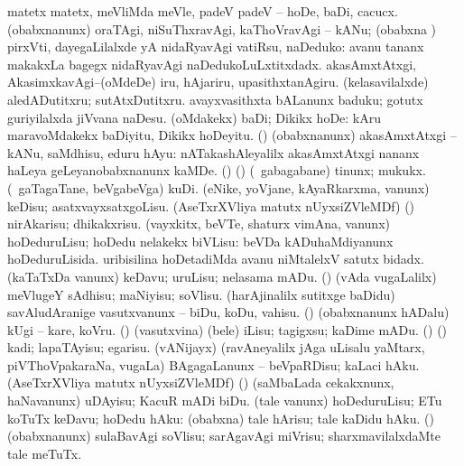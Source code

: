 \noindent
\gl{\pagu}
\bmng
\bnum
{}   
\banum
{} matetx matetx, meVliMda meVle, padeV padeV -- hoDe, baDi, cacucx. 
 (obabxnanunx) oraTAgi, niSuThxravAgi, kaThoVravAgi -- kANu; (obabxna \vi) pirxVti, dayegaLilalxde yA nidaRyavAgi vatiRsu, naDeduko:  avanu tananx makakxLa bagegx nidaRyavAgi naDedukoLuLxtitxdadx. 
 akasAmxtAtxgi, AkasimxkavAgi--(oMdeDe) iru, hAjariru, upasithxtanAgiru. 
 (kelasavilalxde) aledADutitxru; sutAtxDutitxru. 
 avayxvasithxta bALanunx baduku; gotutx guriyilalxda jiVvana naDesu. 
\eanum
\numie
{}  
\banum
{} (oMdakekx) baDi; Dikikx hoDe:  kAru maravoMdakekx baDiyitu, Dikikx hoDeyitu. 
 (\rUpa) (obabxnanunx) akasAmxtAtxgi -- kANu, saMdhisu, eduru hAyu:  nATakashAleyalilx akasAmxtAtxgi nananx haLeya geLeyanobabxnanunx kaMDe. 
\eanum
\numie
{}  (\birx) (\ashi) 
\banum
{} (\kanmu\ gabagabane) tinunx; mukukx. 
 (\kanmu\ gaTagaTane, beVgabeVga) kuDi. 
 (eNike, yoVjane, kAyaRkarxma, \mo vanunx) keDisu; asatxvayxsatxgoLisu. 
 (AseTxrXVliya matutx nUyxsiZVleMDf) (\AmA) nirAkarisu; dhikakxrisu. 
\eanum
\numie
{}  
\banum
{} (vayxkitx, beVTe, shaturx vimAna, \mo vanunx) hoDeduruLisu; hoDedu nelakekx biVLisu:  beVDa kADuhaMdiyanunx hoDeduruLisida.  uribisilina hoDetadiMda avanu niMtalelxV satutx bidadx. 
 (kaTaTxDa \mo vanunx) keDavu; uruLisu; nelasama mADu. 
 (\rUpa) (vAda \mo vugaLalilx) meVlugeY sAdhisu; maNiyisu; soVlisu. 
 (harAjinalilx sutitxge baDidu) savAludAranige vasutxvanunx -- biDu, koDu, vahisu. 
 (\AmA) (obabxnanunx hADalu) kUgi -- kare, koVru. 
 (\AmA) (vasutxvina) (bele) iLisu; tagigxsu; kaDime mADu. 
 (\ame) (\ashi) kadi; lapaTAyisu; egarisu. 
 (vANijayx) (ravAneyalilx jAga uLisalu yaMtarx, piVThoVpakaraNa, \mo vugaLa) BAgagaLanunx -- beVpaRDisu; kaLaci hAku. 
 (AseTxrXVliya matutx nUyxsiZVleMDf) (\ashi) (saMbaLada cekakxnunx, haNavanunx) uDAyisu; KacuR mADi biDu. 
\eanum
\numie
{}  
\banum
{} (tale \mo vanunx) hoDeduruLisu; ETu koTuTx keDavu; hoDedu hAku:  (obabxna) tale hArisu; tale kaDidu hAku. 
 (\rUpa) (obabxnanunx) sulaBavAgi soVlisu; sarAgavAgi miVrisu; sharxmavilalxdaMte tale meTuTx. 
